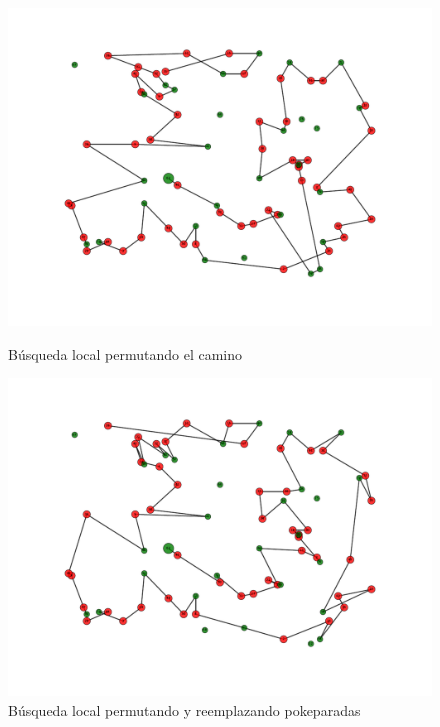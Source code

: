 \begin{figure}[H]
\centering
\begin{minipage}{0.45\textwidth}
\centering
    \includegraphics[scale=0.4]{../experimentacion/ej5/ejemplo-salidaBLPC.pdf}
    \caption{B\'usqueda local permutando el camino}
    \label{fig:ejemplo-salidaBLPC}
\end{minipage}
\qquad
\begin{minipage}{0.45\textwidth}
\centering
    \includegraphics[scale=0.4]{../experimentacion/ej5/ejemplo-salidaBLPYRP.pdf}
    \caption{B\'usqueda local permutando y reemplazando pokeparadas}
    \label{fig:ejemplo-salidaBLPYRP}
\end{minipage}
\end{figure}